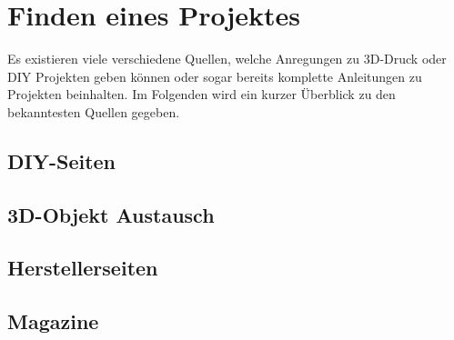\chapter{Finden eines Projektes}
Es existieren viele verschiedene Quellen, welche Anregungen zu 3D-Druck oder \ac{DIY} Projekten geben können oder sogar bereits komplette Anleitungen zu Projekten beinhalten. Im Folgenden wird ein kurzer Überblick zu den bekanntesten Quellen gegeben.

\section{DIY-Seiten}

\section{3D-Objekt Austausch}

\section{Herstellerseiten}

\section{Magazine}